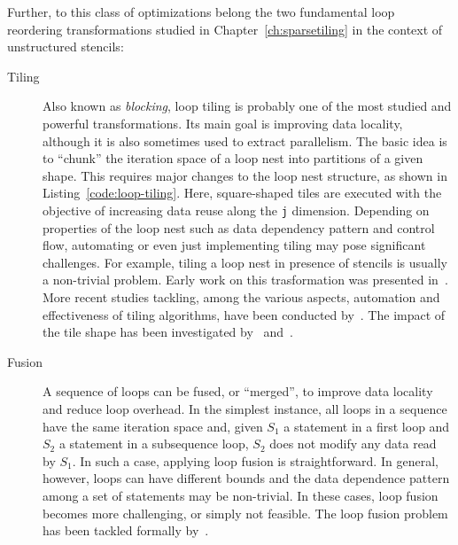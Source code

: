 Further, to this class of optimizations belong the two fundamental loop reordering transformations studied in Chapter~\ref{ch:sparsetiling} in the context of unstructured stencils:
\begin{description}
\item[Tiling] Also known as {\em blocking}, loop tiling is probably one of the most studied and powerful transformations. Its main goal is improving data locality, although it is also sometimes used to extract parallelism. The basic idea is to ``chunk'' the iteration space of a loop nest into partitions of a given shape. This requires major changes to the loop nest structure, as shown in Listing~\ref{code:loop-tiling}. Here, square-shaped tiles are executed with the objective of increasing data reuse along the \texttt{j} dimension. Depending on properties of the loop nest such as data dependency pattern and control flow, automating or even just implementing tiling may pose significant challenges. For example, tiling a loop nest in presence of stencils is usually a non-trivial problem. Early work on this trasformation was presented in~\cite{early-tile-cite-1,early-tile-cite-2}. More recent studies tackling, among the various aspects, automation and effectiveness of tiling algorithms, have been conducted by~\cite{recent-tile-cite-1,recent-tile-cite-2,recent-tile-cite-3}. The impact of the tile shape has been investigated by~\cite{tile-shape-1} and~\cite{tile-shape-2}. 
\item[Fusion] A sequence of loops can be fused, or ``merged'', to improve data locality and reduce loop overhead. In the simplest instance, all loops in a sequence have the same iteration space and, given $S_1$ a statement in a first loop and $S_2$ a statement in a subsequence loop, $S_2$ does not modify any data read by $S_1$. In such a case, applying loop fusion is straightforward. In general, however, loops can have different bounds and the data dependence pattern among a set of statements may be non-trivial. In these cases, loop fusion becomes more challenging, or simply not feasible. The loop fusion problem has been tackled formally by~\cite{fusion-complexity}.
\end{description}


